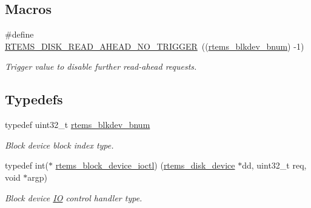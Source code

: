 \subsection*{Macros}
\begin{DoxyCompactItemize}
\item 
\mbox{\label{group__rtems__disk_gaee772b1121d8d039acb0e0126341a1de}} 
\#define \mbox{\hyperlink{group__rtems__disk_gaee772b1121d8d039acb0e0126341a1de}{R\+T\+E\+M\+S\+\_\+\+D\+I\+S\+K\+\_\+\+R\+E\+A\+D\+\_\+\+A\+H\+E\+A\+D\+\_\+\+N\+O\+\_\+\+T\+R\+I\+G\+G\+ER}}~((\mbox{\hyperlink{group__rtems__disk_ga5fbcfd40b657bff6c54d9e393fab3274}{rtems\+\_\+blkdev\+\_\+bnum}}) -\/1)
\begin{DoxyCompactList}\small\item\em Trigger value to disable further read-\/ahead requests. \end{DoxyCompactList}\end{DoxyCompactItemize}
\subsection*{Typedefs}
\begin{DoxyCompactItemize}
\item 
\mbox{\label{group__rtems__disk_ga5fbcfd40b657bff6c54d9e393fab3274}} 
typedef uint32\+\_\+t \mbox{\hyperlink{group__rtems__disk_ga5fbcfd40b657bff6c54d9e393fab3274}{rtems\+\_\+blkdev\+\_\+bnum}}
\begin{DoxyCompactList}\small\item\em Block device block index type. \end{DoxyCompactList}\item 
\mbox{\label{group__rtems__disk_gacbf717f10129b976deaf8e6f4deb17ad}} 
typedef int($\ast$ \mbox{\hyperlink{group__rtems__disk_gacbf717f10129b976deaf8e6f4deb17ad}{rtems\+\_\+block\+\_\+device\+\_\+ioctl}}) (\mbox{\hyperlink{structrtems__disk__device}{rtems\+\_\+disk\+\_\+device}} $\ast$dd, uint32\+\_\+t req, void $\ast$argp)
\begin{DoxyCompactList}\small\item\em Block device \mbox{\hyperlink{structIO}{IO}} control handler type. \end{DoxyCompactList}\end{DoxyCompactItemize}
